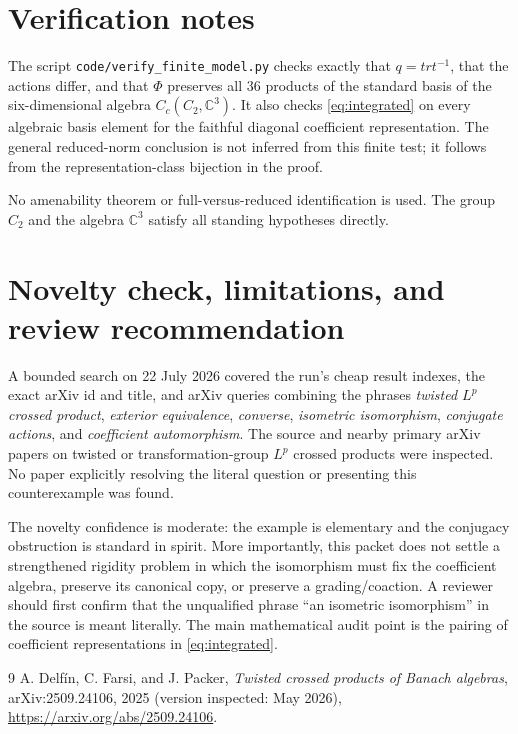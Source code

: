 \documentclass[11pt]{article}
\newcommand{\C}{\mathbb C}
\begin{document}
\section{Verification notes}

The script \texttt{code/verify\_finite\_model.py} checks exactly that
$q=trt^{-1}$, that the actions differ, and that $\Phi$ preserves all $36$
products of the standard basis of the six-dimensional algebra
$C_c(C_2,\C^3)$.  It also checks \eqref{eq:integrated} on every algebraic basis
element for the faithful diagonal coefficient representation.  The general
reduced-norm conclusion is not inferred from this finite test; it follows from
the representation-class bijection in the proof.

No amenability theorem or full-versus-reduced identification is used.  The
group $C_2$ and the algebra $\C^3$ satisfy all standing hypotheses directly.

\section{Novelty check, limitations, and review recommendation}

A bounded search on 22 July 2026 covered the run's cheap result indexes, the
exact arXiv id and title, and arXiv queries combining the phrases
\emph{twisted $L^p$ crossed product}, \emph{exterior equivalence},
\emph{converse}, \emph{isometric isomorphism}, \emph{conjugate actions}, and
\emph{coefficient automorphism}.  The source and nearby primary arXiv papers
on twisted or transformation-group $L^p$ crossed products were inspected.  No
paper explicitly resolving the literal question or presenting this
counterexample was found.

The novelty confidence is moderate: the example is elementary and the
conjugacy obstruction is standard in spirit.  More importantly, this packet
does not settle a strengthened rigidity problem in which the isomorphism must
fix the coefficient algebra, preserve its canonical copy, or preserve a
grading/coaction.  A reviewer should first confirm that the unqualified phrase
``an isometric isomorphism'' in the source is meant literally.  The main
mathematical audit point is the pairing of coefficient representations in
\eqref{eq:integrated}.

\begin{thebibliography}{9}
A. Delf\'in, C. Farsi, and J. Packer,
\emph{Twisted crossed products of Banach algebras},
arXiv:2509.24106, 2025 (version inspected: May 2026),
\url{https://arxiv.org/abs/2509.24106}.
\end{thebibliography}
\end{document}
